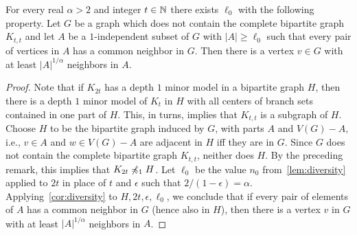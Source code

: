 \begin{corollary}\label{cor:biversity}
    For every real $\alpha>2$ and integer $t\in\mathbb{N}$ there exists $\ell_0$ with the following property.
  Let $G$ be a graph which does not contain 
  the complete bipartite graph $K_{t,t}$ and let
  $A$ be a $1$-independent subset of $G$ with $|A|\ge \ell_0$ such that every pair of vertices in $A$ has a common neighbor in $G$.
   Then there is a vertex $v\in G$
  with at least $|A|^{1/\alpha}$ neighbors in $A$.
\end{corollary}
\begin{proof}\label{pf:}
    Note that if $K_{2t}$ has a depth $1$ minor model in 
    a bipartite graph $H$, then there is a depth $1$ minor model of $K_{t}$ in $H$ with all centers of branch sets contained in one part of $H$. This, in turns, implies that $K_{t,t}$ is a subgraph of $H$.
  Choose $H$ to be the bipartite graph induced 
  by $G$, with parts $A$ and $V(G)-A$, i.e.,  $v\in A$ and $w\in V(G)-A$ are adjacent in $H$ iff they are in $G$. Since $G$ does not contain the complete bipartite graph $K_{t,t}$, neither does $H$. By the preceding remark, this implies  that $K_{2t}\not\preccurlyeq_1 H$.
  Let $\ell_0$
    be the value $n_0$ from~\cref{lem:diversity} applied to $2t$ in place of $t$ and $\epsilon$ such that $2/(1-\epsilon)=\alpha$. Applying~\cref{cor:diversity} to $H,2t,\epsilon,\ell_0$, we conclude that if every pair of elements of $A$ has a common neighbor in $G$
    (hence also in $H$), then there is a vertex $v$
    in $G$ with at least $|A|^{1/\alpha}$ neighbors in $A$.
\end{proof}

